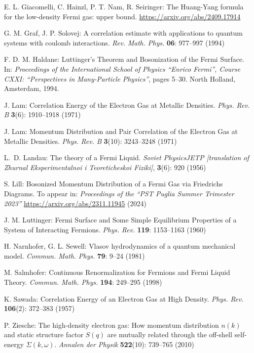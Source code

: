 \documentclass[12pt,a4paper]{article}
\numberwithin{equation}{section}
\newcommand{\1}{\mathbb{I}}
\theoremstyle{plain}
\theoremstyle{definition}
\theoremstyle{remark}
\theoremstyle{plain}
\theoremstyle{definition}
\theoremstyle{remark}
\begin{document}
\begin{thebibliography}{29}
E. L. Giacomelli, C. Hainzl, P. T. Nam, R. Seiringer:
	The Huang-Yang formula for the low-density Fermi gas: upper bound.
	\url{https://arxiv.org/abs/2409.17914}

G. M. Graf, J. P. Solovej:
	A correlation estimate with applications to quantum systems with coulomb interactions.
	\emph{Rev. Math. Phys.} \textbf{06}: 977--997 (1994)

F. D. M. Haldane:
	Luttinger's {{Theorem}} and {{Bosonization}} of the {{Fermi Surface}}.
	In: \emph{Proceedings of the {{International School}} of {{Physics}}
  ``{{Enrico Fermi}}'', {{Course CXXI}}: ``{{Perspectives}} in
  {{Many}}-{{Particle Physics}}''}, pages 5--30. {North Holland}, {Amsterdam},
  1994.

J. Lam:
	Correlation Energy of the Electron Gas at Metallic Densities.
	\emph{Phys. Rev. B} \textbf{3}(6): 1910--1918 (1971)

J. Lam:
	Momentum Distribution and Pair Correlation of the Electron Gas at Metallic Densities.
	\emph{Phys. Rev. B} \textbf{3}(10): 3243--3248 (1971)

L.~D. Landau:
	The theory of a Fermi Liquid.
	\emph{Soviet Physics\textendash JETP [translation of Zhurnal
  Eksperimentalnoi i Teoreticheskoi Fiziki]}, \textbf{3}(6): 920 (1956)

S. Lill:
	Bosonized Momentum Distribution of a Fermi Gas via Friedrichs Diagrams.
	To appear in: \emph{Proceedings of the ``PST Puglia Summer Trimester 2023''} \url{https://arxiv.org/abs/2311.11945} (2024)

J. M. Luttinger:
	Fermi Surface and Some Simple Equilibrium Properties of a System of Interacting Fermions.
	\emph{Phys. Rev.} \textbf{119}: 1153--1163 (1960)

H. Narnhofer, G. L. Sewell:
	Vlasov hydrodynamics of a quantum mechanical model.
	\emph{Commun. Math. Phys.} \textbf{79}: 9--24 (1981)

M. Salmhofer:
	Continuous Renormalization for Fermions and Fermi Liquid Theory.
	\emph{Commun. Math. Phys.} \textbf{194}: 249--295 (1998)

K. Sawada:
	Correlation Energy of an Electron Gas at High Density.
	\emph{Phys. Rev.} \textbf{106}(2): 372--383 (1957)

P. Ziesche:
	The high-density electron gas: How momentum distribution $n(k)$ and static structure factor $S(q)$ are mutually related through the off-shell self-energy $\Sigma(k,\omega)$.
	\emph{Annalen der Physik} \textbf{522}(10): 739--765 (2010)

\end{thebibliography}
\end{document}

